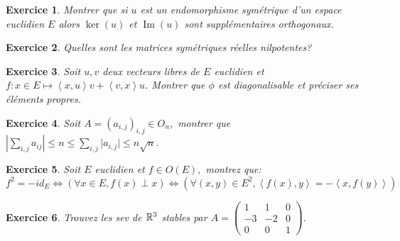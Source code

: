 \documentclass[12pt,a4paper]{article}
\newcommand{\ps}[2]{\left\langle#1,#2\right\rangle}
\DeclareMathOperator{\Ima }{Im}
\theoremstyle{break}
\newtheorem{Exo}{Exercice}
\begin{document}
\begin{Exo}
	Montrer que si $u$ est un endomorphisme symétrique d'un espace euclidien $E$ alors $\ker(u)$ et $\Ima(u)$ sont supplémentaires orthogonaux.
\end{Exo}

\begin{Exo}
	Quelles sont les matrices symétriques réelles nilpotentes?
\end{Exo}
	
\begin{Exo}
	Soit $u,v$ deux vecteurs libres de $E$ euclidien et $f:x\in E\mapsto \ps{x}{u}v+\ps{v}{x}u$. Montrer que $\phi$ est diagonalisable et préciser ses éléments propres.
\end{Exo}
	
  \begin{Exo}
		Soit $A=\left( a_{i,j}\right)_{i,j} \in O_{n},$ montrer que $\left|
	\sum_{i,j}a_{ij}\right| \leqslant n\leqslant \sum_{i,j}\lvert a_{i,j}\rvert\leqslant n\sqrt{n}$.
	\end{Exo}
	
	  \begin{Exo}
	  	Soit $E$ euclidien et $f\in O\left( E\right) ,$ montrez que: 
	\[
	f^{2}=-id_{E}\Leftrightarrow \left( \forall x\in E,f\left( x\right) \perp
	x\right) \Leftrightarrow \left( \forall \left( x,y\right) \in
	E^{2},\left\langle f\left( x\right) ,y\right\rangle =-\left\langle x,f\left(
	y\right) \right\rangle \right) 
	\]
	  \end{Exo}
	
	  \begin{Exo}
		Trouvez les sev de $\Bbb{R}^{3}$ stables par $A=\left( 
	\begin{array}{lll}
		1 & 1 & 0 \\ 
		-3 & -2 & 0 \\ 
		0 & 0 & 1
	\end{array}
	\right) .$
	\end{Exo}
\end{document}
